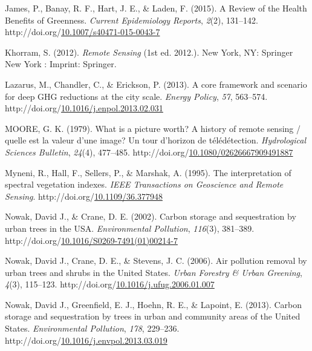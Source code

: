 \documentclass[12pt,twoside]{reedthesis}
\newlength{\cslhangindent}
\newenvironment{CSLReferences}[2] %
 {%
  \setlength{\parindent}{0pt}
  \ifodd #1 \everypar{\setlength{\hangindent}{\cslhangindent}}\ignorespaces\fi
  \ifnum #2 > 0
  \setlength{\parskip}{#2\baselineskip}
  \fi
 }%
 {}
\begin{document}
\begin{CSLReferences}{1}{0}
\leavevmode{}%
James, P., Banay, R. F., Hart, J. E., \& Laden, F. (2015). A Review of the Health Benefits of Greenness. \emph{Current Epidemiology Reports}, \emph{2}(2), 131--142. http://doi.org/\href{https://doi.org/10.1007/s40471-015-0043-7}{10.1007/s40471-015-0043-7}

\leavevmode{}%
Khorram, S. (2012). \emph{Remote Sensing} (1st ed. 2012.). New York, NY: Springer New York : Imprint: Springer.

\leavevmode{}%
Lazarus, M., Chandler, C., \& Erickson, P. (2013). A core framework and scenario for deep GHG reductions at the city scale. \emph{Energy Policy}, \emph{57}, 563--574. http://doi.org/\href{https://doi.org/10.1016/j.enpol.2013.02.031}{10.1016/j.enpol.2013.02.031}

\leavevmode{}%
MOORE, G. K. (1979). What is a picture worth? A history of remote sensing / quelle est la valeur d'une image? Un tour d'horizon de télédétection. \emph{Hydrological Sciences Bulletin}, \emph{24}(4), 477--485. http://doi.org/\href{https://doi.org/10.1080/02626667909491887}{10.1080/02626667909491887}

\leavevmode{}%
Myneni, R., Hall, F., Sellers, P., \& Marshak, A. (1995). The interpretation of spectral vegetation indexes. \emph{IEEE Transactions on Geoscience and Remote Sensing}. http://doi.org/\href{https://doi.org/10.1109/36.377948}{10.1109/36.377948}

\leavevmode{}%
Nowak, David J., \& Crane, D. E. (2002). Carbon storage and sequestration by urban trees in the USA. \emph{Environmental Pollution}, \emph{116}(3), 381--389. http://doi.org/\href{https://doi.org/10.1016/S0269-7491(01)00214-7}{10.1016/S0269-7491(01)00214-7}

\leavevmode{}%
Nowak, David J., Crane, D. E., \& Stevens, J. C. (2006). Air pollution removal by urban trees and shrubs in the United States. \emph{Urban Forestry \& Urban Greening}, \emph{4}(3), 115--123. http://doi.org/\href{https://doi.org/10.1016/j.ufug.2006.01.007}{10.1016/j.ufug.2006.01.007}

\leavevmode{}%
Nowak, David J., Greenfield, E. J., Hoehn, R. E., \& Lapoint, E. (2013). Carbon storage and sequestration by trees in urban and community areas of the United States. \emph{Environmental Pollution}, \emph{178}, 229--236. http://doi.org/\href{https://doi.org/10.1016/j.envpol.2013.03.019}{10.1016/j.envpol.2013.03.019}


\end{CSLReferences}
\end{document}

